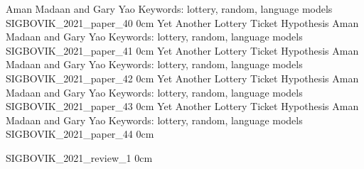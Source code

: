 	{Aman Madaan and Gary Yao}
	{Keywords: lottery, random, language models}
	{SIGBOVIK_2021_paper_40}
	{0cm}
	{}
\addpaper
	{Yet Another Lottery Ticket Hypothesis}
	{Aman Madaan and Gary Yao}
	{Keywords: lottery, random, language models}
	{SIGBOVIK_2021_paper_41}
	{0cm}
	{}
\addpaper
	{Yet Another Lottery Ticket Hypothesis}
	{Aman Madaan and Gary Yao}
	{Keywords: lottery, random, language models}
	{SIGBOVIK_2021_paper_42}
	{0cm}
	{}
\addpaper
	{Yet Another Lottery Ticket Hypothesis}
	{Aman Madaan and Gary Yao}
	{Keywords: lottery, random, language models}
	{SIGBOVIK_2021_paper_43}
	{0cm}
	{}
\addpaper
	{Yet Another Lottery Ticket Hypothesis}
	{Aman Madaan and Gary Yao}
	{Keywords: lottery, random, language models}
	{SIGBOVIK_2021_paper_44}
	{0cm}
	{}

\addreview
	{SIGBOVIK_2021_review_1}
	{0cm}
